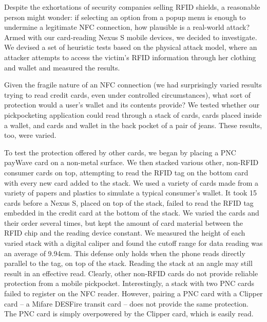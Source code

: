 \documentclass{sig-alternate}
\begin{document}
Despite the exhortations of security companies selling RFID shields, a reasonable person might wonder:  if selecting an option from a popup menu is enough to undermine a legitimate NFC connection, how plausible is a real-world attack?  Armed with our card-reading Nexus S mobile devices, we decided to investigate.  We devised a set of heuristic tests based on the physical attack model, where an attacker attempts to access the victim's RFID information through her clothing and wallet and measured the results.  

Given the fragile nature of an NFC connection (we had surprisingly varied results trying to read credit cards, even under controlled circumstances), what sort of protection would a user's wallet and its contents provide?  We tested whether our pickpocketing application could read through a stack of cards, cards placed inside a wallet, and cards and wallet in the back pocket of a pair of jeans.  These results, too, were varied.

To test the protection offered by other cards, we began by placing a PNC payWave card on a non-metal surface.  We then stacked various other, non-RFID consumer cards on top, attempting to read the RFID tag on the bottom card with every new card added to the stack.  We used a variety of cards made from a variety of papers and plastics to simulate a typical consumer's wallet.  It took 15 cards before a Nexus S, placed on top of the stack, failed to read the RFID tag embedded in the credit card at the bottom of the stack.  We varied the cards and their order several times, but kept the amount of card material between the RFID chip and the reading device constant.  We measured the height of each varied stack with a digital caliper and found the cutoff range for data reading was an average of 9.94cm.  This defense only holds when the phone reads directly parallel to the tag, on top of the stack.  Reading the stack at an angle may still result in an effective read.  Clearly, other non-RFID cards do not provide reliable protection from a mobile pickpocket.  Interestingly, a stack with two PNC cards failed to register on the NFC reader.  However, pairing a PNC card with a Clipper card -- a Mifare DESFire transit card -- does not provide the same protection.  The PNC card is simply overpowered by the Clipper card, which is easily read.
\end{document}
